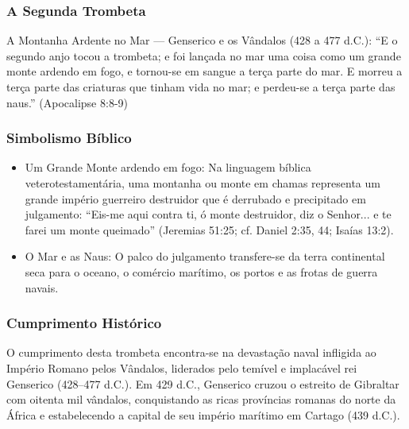 \documentclass[11pt,a4paper,openany]{book}
\begin{document}
\subsubsection*{A Segunda Trombeta}
A Montanha Ardente no Mar — Genserico e os Vândalos (428 a 477 d.C.):
``E o segundo anjo tocou a trombeta; e foi lançada no mar uma coisa como um grande monte ardendo em fogo, e tornou-se em sangue a terça parte do mar. E morreu a terça parte das criaturas que tinham vida no mar; e perdeu-se a terça parte das naus.'' (Apocalipse 8:8-9)


\subsubsection*{Simbolismo Bíblico}
\begin{itemize}
  \item Um Grande Monte ardendo em fogo: Na linguagem bíblica veterotestamentária, uma montanha ou monte em chamas representa um grande império guerreiro destruidor que é derrubado e precipitado em julgamento: ``Eis-me aqui contra ti, ó monte destruidor, diz o Senhor... e te farei um monte queimado'' (Jeremias 51:25; cf. Daniel 2:35, 44; Isaías 13:2).
  \item O Mar e as Naus: O palco do julgamento transfere-se da terra continental seca para o oceano, o comércio marítimo, os portos e as frotas de guerra navais.
\end{itemize}



\subsubsection*{Cumprimento Histórico}
O cumprimento desta trombeta encontra-se na devastação naval infligida ao Império Romano pelos Vândalos, liderados pelo temível e implacável rei Genserico (428–477 d.C.). Em 429 d.C., Genserico cruzou o estreito de Gibraltar com oitenta mil vândalos, conquistando as ricas províncias romanas do norte da África e estabelecendo a capital de seu império marítimo em Cartago (439 d.C.).
\end{document}
